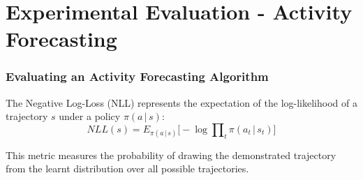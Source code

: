 \section{Experimental Evaluation - Activity Forecasting}

\begin{frame}
	\frametitle{Evaluating an Activity Forecasting Algorithm}
	
	\Large
	
	\vspace{0.45cm}
	
	The Negative Log-Loss (NLL) represents the expectation of the log-likelihood of a trajectory $ s $
	under a policy $ \pi(a \, | \, s) $:
	\vspace{-0.1cm}
	\begin{equation*}
		NLL(s) = E_{\pi(a \, | \, s)} \Big [ -\log \prod\nolimits_t \pi(a_t \, | \, s_t)  \Big ]
	\end{equation*}
	
	\vspace{0.1cm}
	
	This metric measures the probability of drawing the demonstrated trajectory from the learnt
	distribution over all possible trajectories. \\
\end{frame}

